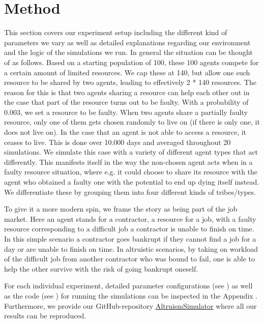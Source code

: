 \documentclass[sigconf]{acmart}
\newcommand{\todo}[1]{{\color{red}{#1}}}
\newcommand{\VNumSimulations}{20\xspace}
\newcommand{\VNumDays}{10.000\xspace}
\newcommand{\VNumPop}{100\xspace}
\newcommand{\VNumTrees}{140\xspace}
\newcommand{\VProbPredator}{0.003\xspace}
\begin{document}
    \section{Method}\label{sec:method}
    This section covers our experiment setup including the different kind of parameters we vary as well as detailed explanations regarding our environment and the logic of the simulations we run.
    In general the situation can be thought of as follows.
    Based on a starting population of \VNumPop, these \VNumPop agents compete for a certain amount of limited resources.
    We cap these at \VNumTrees, but allow one such resource to be shared by two agents, leading to effectively 2 * \VNumTrees resources.
    The reason for this is that two agents sharing a resource can help each other out in the case that part of the resource turns out to be faulty.
    With a probability of \VProbPredator, we set a resource to be faulty.
    When two agents share a partially faulty resource, only one of them gets chosen randomly to live on (if there is only one, it does not live on).
    In the case that an agent is not able to access a resource, it ceases to live.
    This is done over \VNumDays days and averaged throughout \VNumSimulations simulations.
    We simulate this case with a variety of different agent types that act differently.
    This manifests itself in the way the non-chosen agent acts when in a faulty resource situation, where e.g. it could choose to share its resource with the agent who obtained a faulty one with the potential to end up dying itself instead.\todo{dont understand that one}
    We differentiate these by grouping them into four different kinds of tribes/types.

    To give it a more modern spin, we frame the story as being part of the job market.
    Here an agent stands for a contractor, a resource for a job, with a faulty resource corresponding to a difficult job a contractor is unable to finish on time.
    In this simple scenario a contractor goes bankrupt if they cannot find a job for a day or are unable to finish on time.
    In altruistic scenarios, by taking on workload of the difficult job from another contractor who was bound to fail, one is able to help the other survive with the risk of going bankrupt oneself.

    For each individual experiment, detailed parameter configurations (see ) as well as the code (see ) for running the simulations can be inspected in the Appendix .
    Furthermore, we provide our GitHub-repository {\color{blue}\href{https://github.com/RafaelSterzinger/AltruismSimulator}{AltruismSimulator}} where all our results can be reproduced.
\end{document}
